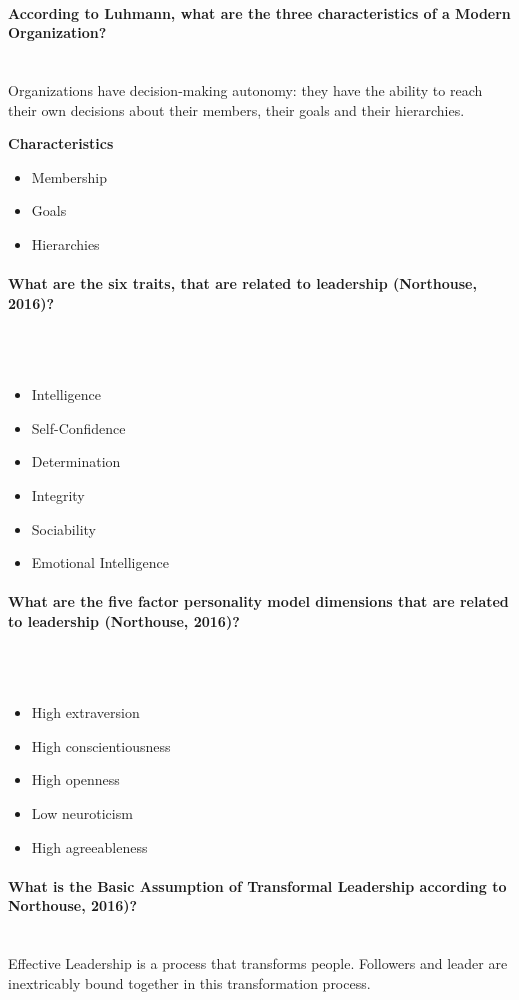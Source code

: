 \documentclass[10pt,a4paper,noendnumber=true]{scrartcl}
\newcommand{\properparagraph}[1]{\paragraph{\textcolor{Emerald}{#1}}\mbox{}\\}
\begin{document}
\properparagraph{ According to Luhmann, what are the three characteristics of a Modern Organization?}
Organizations have decision-making autonomy: they have the ability to reach their own decisions about their members, their goals and their hierarchies.

\textbf{Characteristics}
\begin{itemize}
	\item Membership
	\item Goals
	\item Hierarchies
\end{itemize}

\properparagraph{What are the six traits, that are related to leadership (Northouse, 2016)?}
\\[-6ex]
\begin{itemize}
	\item Intelligence
	\item Self-Confidence
	\item Determination
	\item Integrity
	\item Sociability
	\item Emotional Intelligence
\end{itemize}

\properparagraph{What are the five factor personality model dimensions that are related to leadership (Northouse, 2016)?}
\\[-6ex]
\begin{itemize}
	\item High extraversion
	\item High conscientiousness
	\item High openness
	\item Low neuroticism
	\item High agreeableness
\end{itemize}

\properparagraph{What is the Basic Assumption of Transformal Leadership according to Northouse, 2016)?}
Effective Leadership is a process that transforms people. Followers and leader are inextricably bound together in this transformation process.
\end{document}
